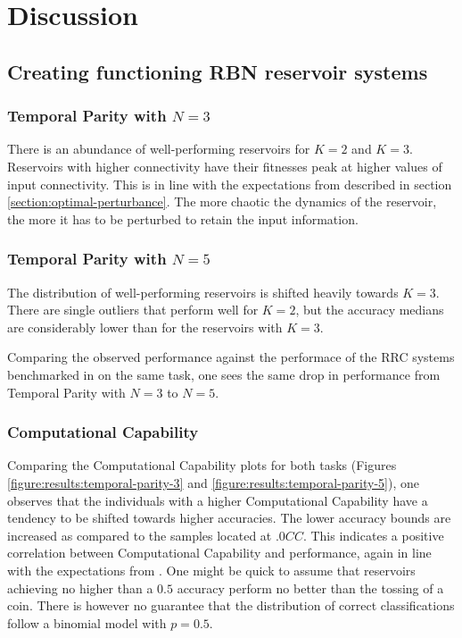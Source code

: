 \section{Discussion}

\subsection{Creating functioning RBN reservoir systems}

\subsubsection{Temporal Parity with $N=3$}
There is an abundance of well-performing reservoirs for $K=2$ and $K=3$.
Reservoirs with higher connectivity have their fitnesses peak at higher values of input connectivity.
This is in line with the expectations from \cite{rbn-reservoir} described in section \ref{section:optimal-perturbance}.
The more chaotic the dynamics of the reservoir,
the more it has to be perturbed to retain the input information.

\subsubsection{Temporal Parity with $N=5$}
The distribution of well-performing reservoirs is shifted heavily towards $K=3$.
There are single outliers that perform well for $K=2$,
but the accuracy medians are considerably lower than for the reservoirs with $K=3$.

Comparing the observed performance against the performace of the RRC systems benchmarked in \cite{rbn-reservoir} on the same task,
one sees the same drop in performance from Temporal Parity with $N=3$ to $N=5$.

\subsubsection{Computational Capability}
Comparing the Computational Capability plots for both tasks (Figures \ref{figure:results:temporal-parity-3} and \ref{figure:results:temporal-parity-5}),
one observes that the individuals with a higher Computational Capability have a tendency to be shifted towards higher accuracies.
The lower accuracy bounds are increased as compared to the samples located at $.0CC$.
This indicates a positive correlation between Computational Capability and performance,
again in line with the expectations from \cite{rbn-reservoir}.
One might be quick to assume that reservoirs achieving no higher than a $0.5$ accuracy perform no better than the tossing of a coin.
There is however no guarantee that the distribution of correct classifications follow a binomial model with $p=0.5$.

